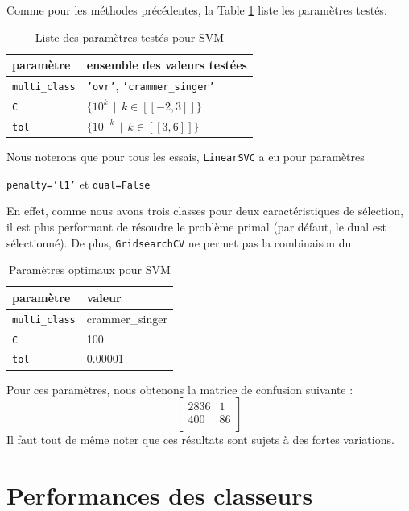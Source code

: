 \documentclass[a4paper]{report}
\begin{document}
Comme pour les méthodes précédentes, la Table \ref{params_svm} liste les paramètres testés.

\begin{table}
\centering
\begin{tabular}{ll}
paramètre & ensemble des valeurs testées \\
\hline
\texttt{multi\_class} & \texttt{'ovr'}, \texttt{'crammer\_singer'} \\
\texttt{C} & $\{10^k \>\> | \>\> k \in [\![-2, 3]\!] \}$ \\
\texttt{tol} & $\{10^{-k} \>\> | \>\> k \in [\![3, 6]\!] \}$ \\
\end{tabular}
\caption{Liste des paramètres testés pour SVM\label{params_svm}}
\end{table}

\noindent Nous noterons que pour tous les essais, \texttt{LinearSVC} a eu pour paramètres \begin{center}
\texttt{penalty='l1'} et \texttt{dual=False}
\end{center}
En effet, comme nous avons trois classes pour deux caractéristiques de sélection, il est plus performant de résoudre le problème primal (par défaut, le dual est sélectionné). De plus, \texttt{GridsearchCV} ne permet pas la combinaison du %


\begin{table}
\centering
\begin{tabular}{ll}
paramètre & valeur \\
\hline
\texttt{multi\_class} & crammer\_singer \\
\texttt{C} & 100 \\
\texttt{tol} & 0.00001\\
\end{tabular}
\caption{Paramètres optimaux pour SVM\label{best_params_svm}}
\end{table}
Pour ces paramètres, nous obtenons la matrice de confusion suivante :
$$\begin{bmatrix}
2836 & 1 \\ 
400 & 86 \\
\end{bmatrix}$$
Il faut tout de même noter que ces résultats sont sujets à des fortes variations.

\section{Performances des classeurs}
\end{document}
